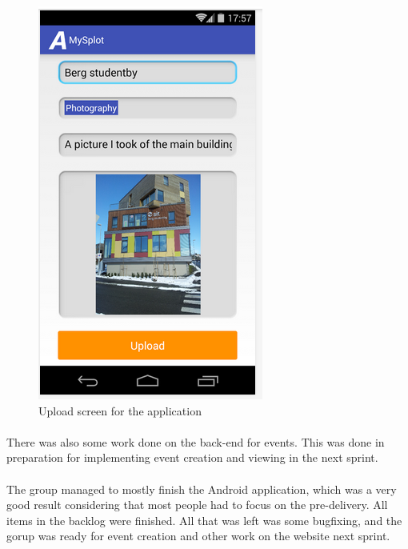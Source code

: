 \begin{figure}
\begin{minipage}{.45\linewidth}
    \includegraphics[width=.8\linewidth]{./Sprint4/img/appUpload.png}
    \caption{Upload screen for the application}
    \label{fig:S4DesignImplAppUpload}
\end{minipage}

\end{figure}

\paragraph{} There was also some work done on the back-end for events. This was done in preparation for implementing event creation and viewing in the next sprint.

\paragraph{} The group managed to mostly finish the Android application, which was a very good result considering that most people had to focus on the pre-delivery. All items in the backlog were finished. All that was left was some bugfixing, and the gorup was ready for event creation and other work on the website next sprint.

